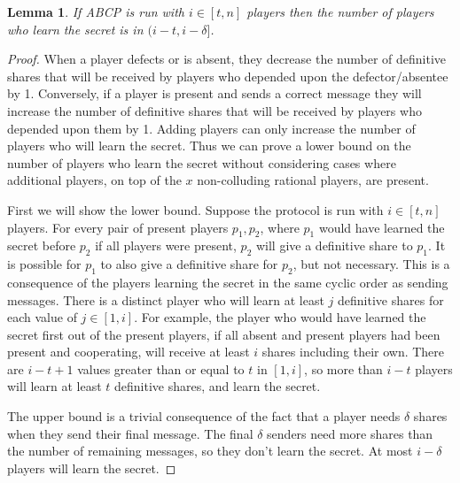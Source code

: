 \documentclass{dalcsthesis}
\newtheorem{lemma}{Lemma}
\begin{document}
\begin{lemma}If ABCP is run with $i \in [t,n]$ players then the number of players who learn the secret is in $(i-t, i-\delta]$. \label{Lem:ABCP:SomeDeltaLose} \end{lemma}
\begin{proof}
When a player defects or is absent, they decrease the number of definitive shares that will be received by players who depended upon the defector/absentee by 1. Conversely, if a player is present and sends a correct message they will increase the number of definitive shares that will be received by players who depended upon them by 1. Adding players can only increase the number of players who will learn the secret. Thus we can prove a lower bound on the number of players who learn the secret without considering cases where additional players, on top of the $x$ non-colluding rational players, are present.

First we will show the lower bound. Suppose the protocol is run with $i \in [t,n]$ players. For every pair of present players $p_1, p_2$, where $p_1$ would have learned the secret before $p_2$ if all players were present, $p_2$ will give a definitive share to $p_1$. It is possible for $p_1$ to also give a definitive share for $p_2$, but not necessary. This is a consequence of the players learning the secret in the same cyclic order as sending messages. There is a distinct player who will learn at least $j$ definitive shares for each value of $j \in [1, i]$. For example, the player who would have learned the secret first out of the present players, if all absent and present players had been present and cooperating, will receive at least $i$ shares including their own. There are $i-t+1$ values greater than or equal to $t$ in $[1,i]$, so more than $i-t$ players will learn at least $t$ definitive shares, and learn the secret.

The upper bound is a trivial consequence of the fact that a player needs $\delta$ shares when they send their final message. The final $\delta$ senders need more shares than the number of remaining messages, so they don't learn the secret. At most $i-\delta$ players will learn the secret.  
\end{proof}
\end{document}
